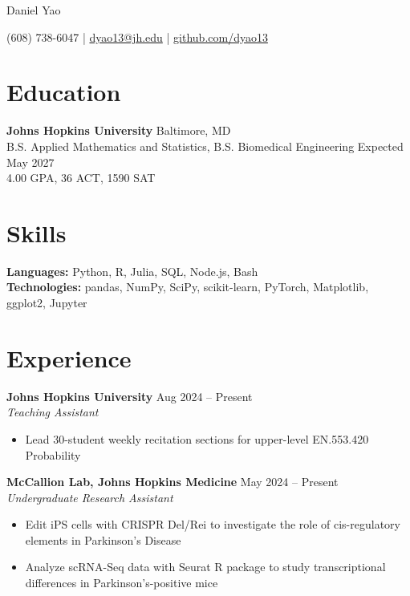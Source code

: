 \documentclass[11pt]{article}       %
\begin{document}
\centerline{\Huge Daniel Yao}

\vspace{5pt}

\centerline{(608) 738-6047 | \href{mailto:dyao13@jh.edu}{dyao13@jh.edu} | \href{https://github.com/dyao13/}{github.com/dyao13}}

\vspace{-9pt}

\section*{Education}
\textbf{Johns Hopkins University} \hfill Baltimore, MD \\
B.S. Applied Mathematics and Statistics, B.S. Biomedical Engineering \hfill Expected May 2027 \\
4.00 GPA, 36 ACT, 1590 SAT

\vspace{-9pt}

\section*{Skills}
\textbf{Languages:} Python, R, Julia, SQL, Node.js, Bash \\
\textbf{Technologies:} pandas, NumPy, SciPy, scikit-learn, PyTorch, Matplotlib, ggplot2, Jupyter

\vspace{-9pt}

\section*{Experience}
\textbf{Johns Hopkins University} \hfill Aug 2024 – Present \\
\textit{Teaching Assistant} \vspace{-9pt} \\
\begin{itemize}
  \item Lead 30-student weekly recitation sections for upper-level EN.553.420 Probability
\end{itemize}

\textbf{McCallion Lab, Johns Hopkins Medicine} \hfill May 2024 – Present \\
\textit{Undergraduate Research Assistant} \vspace{-9pt} \\
\begin{itemize}
  \item Edit iPS cells with CRISPR Del/Rei to investigate the role of cis-regulatory elements in Parkinson’s Disease
  \item Analyze scRNA-Seq data with Seurat R package to study transcriptional differences in Parkinson’s-positive mice
\end{itemize}
\end{document}
